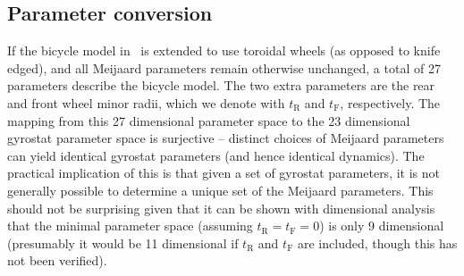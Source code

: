 \subsection{Parameter conversion}\label{model:parameter_conversion}
If the bicycle model in~\cite{Meijaard2007} is extended to use toroidal wheels
(as opposed to knife edged), and all Meijaard parameters remain otherwise
unchanged, a total of 27 parameters describe the bicycle model.  The two extra
parameters are the rear and front wheel minor radii, which we denote with
$t_\text{R}$ and $t_\text{F}$, respectively. The mapping from this 27
dimensional parameter space to the 23 dimensional gyrostat parameter space is
surjective -- distinct choices of Meijaard parameters can yield identical
gyrostat parameters (and hence identical dynamics). The practical implication
of this is that given a set of gyrostat parameters, it is not generally
possible to determine a unique set of the Meijaard parameters. This should not
be surprising given that it can be shown with dimensional analysis that the
minimal parameter space (assuming $t_\text{R}=t_\text{F}=0$) is only 9
dimensional~\cite{Sharp2008} (presumably it would be 11 dimensional if
$t_\text{R}$ and $t_\text{F}$ are included, though this has not been
verified).

